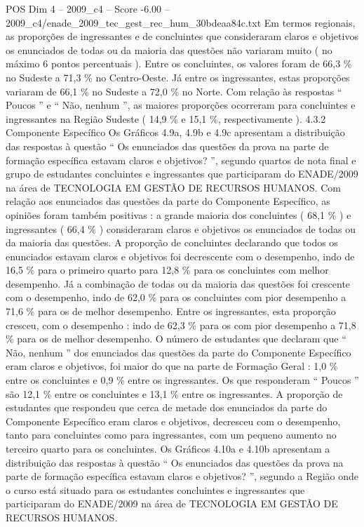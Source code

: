 \begin{textsample}{POS Dim 4 – 2009\_c4 – Score -6.00 – 2009\_c4/enade\_2009\_tec\_gest\_rec\_hum\_30bdeaa84c.txt}
Em termos regionais, as proporções de ingressantes e de concluintes que consideraram claros e objetivos os enunciados de todas ou da maioria das questões não variaram muito ( no máximo 6 pontos percentuais ).
Entre os concluintes, os valores foram de 66,3 \% no Sudeste a 71,3 \% no Centro-Oeste.
Já entre os ingressantes, estas proporções variaram de 66,1 \% no Sudeste a 72,0 \% no Norte.
Com relação às respostas “ Poucos ” e “ Não, nenhum ”, as maiores proporções ocorreram para concluintes e ingressantes na Região Sudeste ( 14,9 \% e 15,1 \%, respectivamente ). 4.3.2 Componente Específico Os Gráficos 4.9a, 4.9b e 4.9c apresentam a distribuição das respostas à questão “ Os enunciados das questões da prova na parte de formação específica estavam claros e objetivos? ”, segundo quartos de nota final e grupo de estudantes concluintes e ingressantes que participaram do ENADE/2009 na área de TECNOLOGIA EM GESTÃO DE RECURSOS HUMANOS.
Com relação aos enunciados das questões da parte do Componente Específico, as opiniões foram também positivas : a grande maioria dos concluintes ( 68,1 \% ) e ingressantes ( 66,4 \% ) consideraram claros e objetivos os enunciados de todas ou da maioria das questões.
A proporção de concluintes declarando que todos os enunciados estavam claros e objetivos foi decrescente com o desempenho, indo de 16,5 \% para o primeiro quarto para 12,8 \% para os concluintes com melhor desempenho.
Já a combinação de todas ou da maioria das questões foi crescente com o desempenho, indo de 62,0 \% para os concluintes com pior desempenho a 71,6 \% para os de melhor desempenho.
Entre os ingressantes, esta proporção cresceu, com o desempenho : indo de 62,3 \% para os com pior desempenho a 71,8 \% para os de melhor desempenho.
O número de estudantes que declaram que “ Não, nenhum ” dos enunciados das questões da parte do Componente Específico eram claros e objetivos, foi maior do que na parte de Formação Geral : 1,0 \% entre os concluintes e 0,9 \% entre os ingressantes.
Os que responderam “ Poucos ” são 12,1 \% entre os concluintes e 13,1 \% entre os ingressantes.
A proporção de estudantes que respondeu que cerca de metade dos enunciados da parte do Componente Específico eram claros e objetivos, decresceu com o desempenho, tanto para concluintes como para ingressantes, com um pequeno aumento no terceiro quarto para os concluintes.
Os Gráficos 4.10a e 4.10b apresentam a distribuição das respostas à questão “ Os enunciados das questões da prova na parte de formação específica estavam claros e objetivos? ”, segundo a Região onde o curso está situado para os estudantes concluintes e ingressantes que participaram do ENADE/2009 na área de TECNOLOGIA EM GESTÃO DE RECURSOS HUMANOS.

\end{textsample}
